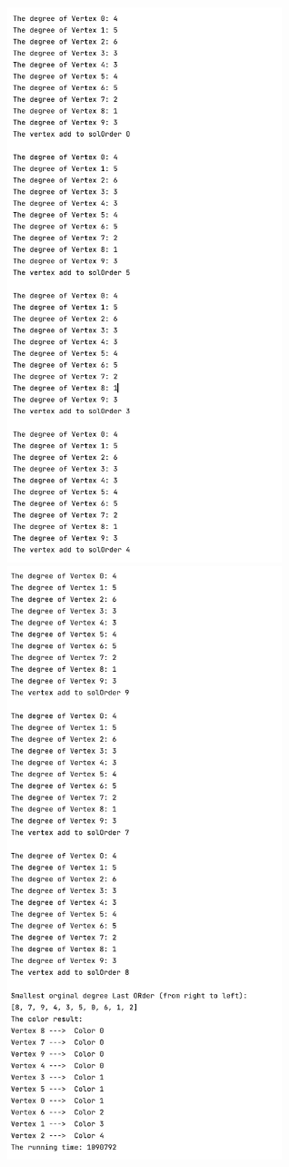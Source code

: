 \documentclass{article}
\begin{document}
\begin{enumerate}
\begin{center}
        \includegraphics[width=0.6\textwidth]{p21.png}
        \includegraphics[width=0.6\textwidth]{p22.png}
    \end{center}



\end{enumerate}
\end{document}
